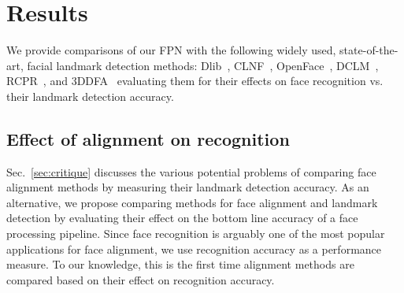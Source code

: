 \documentclass[10pt,twocolumn,letterpaper]{article}
\begin{document}
\section{Results}\label{sec:results}
We provide comparisons of our FPN with the following widely used, state-of-the-art, facial landmark detection methods: Dlib~\cite{king2009dlib}, CLNF~\cite{baltrusaitis2013constrained}, OpenFace~\cite{baltruvsaitis2016openface}, DCLM~\cite{zadeh2016deep}, RCPR~\cite{burgos2013robust}, and 3DDFA~\cite{zhu2015} evaluating them for their effects on face recognition vs. their landmark detection accuracy. 

\subsection{Effect of alignment on recognition}\label{sec:IJBAB}
Sec.~\ref{sec:critique} discusses the various potential problems of comparing face alignment methods by measuring their landmark detection accuracy. As an alternative, we propose comparing methods for face alignment and landmark detection by evaluating their effect on the bottom line accuracy of a face processing pipeline. Since face recognition is arguably one of the most popular applications for face alignment, we use recognition accuracy as a performance measure. To our knowledge, this is the first time alignment methods are compared based on their effect on recognition accuracy.
\end{document}
